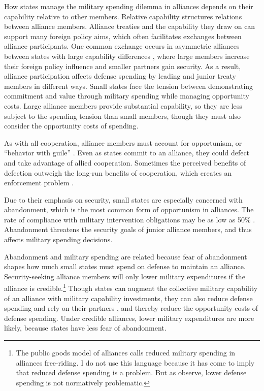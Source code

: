 \documentclass[12pt]{article}
\begin{document}
How states manage the military spending dilemma in alliances depends on their capability relative to other members. 
Relative capability structures relations between alliance members. 
Alliance treaties and the capability they draw on can support many foreign policy aims, which often facilitates exchanges between alliance participants. 
One common exchange occurs in asymmetric alliances between states with large capability differences \citep{Morrow1991}, where large members increase their foreign policy influence and smaller partners gain security. 
As a result, alliance participation affects defense spending by leading and junior treaty members in different ways. 
Small states face the tension between demonstrating commitment and value through military spending while managing opportunity costs. 
Large alliance members provide substantial capability, so they are less subject to the spending tension than small members, though they must also consider the opportunity costs of spending. 


As with all cooperation, alliance members must account for opportunism, or ``behavior with guile'' \citep{Williamson1985}. 
Even as states commit to an alliance, they could defect and take advantage of allied cooperation. 
Sometimes the perceived benefits of defection outweigh the long-run benefits of cooperation, which creates an enforcement problem \citep{Fearon1998a, Koremenosetal2001}.


Due to their emphasis on security, small states are especially concerned with abandonment, which is the most common form of opportunism in alliances.
The rate of compliance with military intervention obligations may be as low as 50\% \citep{BerkemeierFuhrmann2018}.
Abandonment threatens the security goals of junior alliance members, and thus affects military spending decisions. 


Abandonment and military spending are related because fear of abandonment shapes how much small states must spend on defense to maintain an alliance. 
Security-seeking alliance members will only lower military expenditures if the alliance is credible.\footnote{The public goods model of alliances calls reduced military spending in alliances free-riding. I do not use this language because it has come to imply that reduced defense spending is a problem. But as \citet[pg. 278]{OlsonZeckhauser1966} observe, lower defense spending is not normatively problematic.}
Though states can augment the collective military capability of an alliance with military capability investments, they can also reduce defense spending and rely on their partners \citep{OlsonZeckhauser1966, Morrow1993, Conybeare1994, SandlerHartley2001}, and thereby reduce the opportunity costs of defense spending. 
Under credible alliances, lower military expenditures are more likely, because states have less fear of abandonment. 
\end{document}
